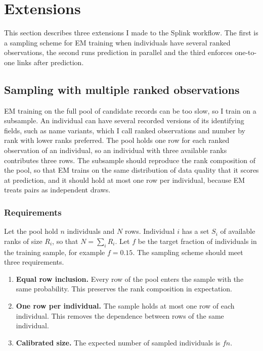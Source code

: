 \documentclass[11pt]{article}
\begin{document}
\section{Extensions}

This section describes three extensions I made to the Splink workflow. The first is a sampling scheme for EM training when individuals have several ranked observations, the second runs prediction in parallel and the third enforces one-to-one links after prediction.

\subsection{Sampling with multiple ranked observations}

EM training on the full pool of candidate records can be too slow, so I train on a subsample. An individual can have several recorded versions of its identifying fields, such as name variants, which I call ranked observations and number by rank with lower ranks preferred. The pool holds one row for each ranked observation of an individual, so an individual with three available ranks contributes three rows. The subsample should reproduce the rank composition of the pool, so that EM trains on the same distribution of data quality that it scores at prediction, and it should hold at most one row per individual, because EM treats pairs as independent draws.

\subsubsection*{Requirements}

Let the pool hold $n$ individuals and $N$ rows. Individual $i$ has a set $S_i$ of available ranks of size $R_i$, so that $N = \sum_i R_i$. Let $f$ be the target fraction of individuals in the training sample, for example $f = 0.15$. The sampling scheme should meet three requirements.

\begin{enumerate}
\item \textbf{Equal row inclusion.} Every row of the pool enters the sample with the same probability. This preserves the rank composition in expectation.
\item \textbf{One row per individual.} The sample holds at most one row of each individual. This removes the dependence between rows of the same individual.
\item \textbf{Calibrated size.} The expected number of sampled individuals is $f n$.
\end{enumerate}
\end{document}
